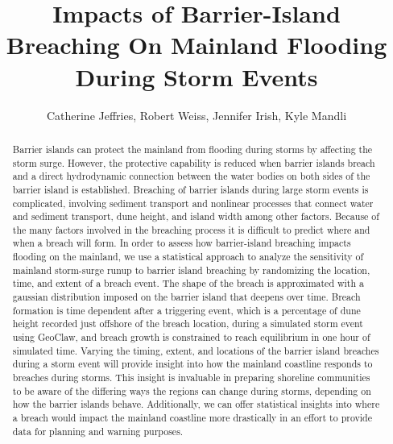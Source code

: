 \documentclass{coastal_paper}
\title{Impacts of Barrier-Island Breaching On Mainland Flooding During Storm Events}
\author{Catherine Jeffries, Robert Weiss, Jennifer Irish, Kyle Mandli}
\begin{document}
\maketitle
\begin{abstract}
Barrier islands can protect the mainland from flooding during storms by affecting the storm surge. However, the protective capability is reduced when barrier islands breach and a direct hydrodynamic connection between the water bodies on both sides of the barrier island is established. Breaching of barrier islands during large storm events is complicated, involving sediment transport and nonlinear processes that connect water and sediment transport, dune height, and island width among other factors. Because of the many factors involved in the breaching process it is difficult to predict where and when a breach will form. In order to assess how barrier-island breaching impacts flooding on the mainland, we use a statistical approach to analyze the sensitivity of mainland storm-surge runup to barrier island breaching by randomizing the location, time, and extent of a breach event. The shape of the breach is approximated with a gaussian distribution imposed on the barrier island that deepens over time. Breach formation is time dependent after a triggering event, which is a percentage of dune height recorded just offshore of the breach location, during a simulated storm event using GeoClaw, and breach growth is constrained to reach equilibrium in one hour of simulated time. Varying the timing, extent, and locations of the barrier island breaches during a storm event will provide insight into how the mainland coastline responds to breaches during storms. This insight is invaluable in preparing shoreline communities to be aware of the differing ways the regions can change during storms, depending on how the barrier islands behave. Additionally, we can offer statistical insights into where a breach would impact the mainland coastline more drastically in an effort to provide data for planning and warning purposes.    
\end{abstract}
\newpage

\linenumbers
\end{document}
